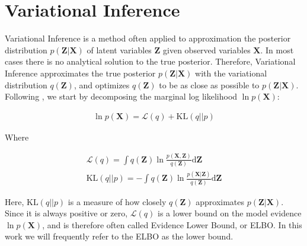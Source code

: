 \documentclass{report}
\begin{document}
\section{Variational Inference}\label{varinf}
Variational Inference is a method often applied to approximation the posterior distribution $p(\mathbf{Z}|\mathbf{X})$ of latent variables $\mathbf{Z}$ given observed variables $\mathbf{X}$. In most cases there is no analytical solution to the true posterior. Therefore, Variational Inference approximates the true posterior $p(\mathbf{Z}|\mathbf{X})$ with the variational distribution $q(\mathbf{Z})$, and optimizes $q(\mathbf{Z})$ to be as close as possible to $p(\mathbf{Z}|\mathbf{X})$. \\
Following \cite{bishop2006pattern}, we start by decomposing the marginal log likelihood $\ln p(\mathbf{X})$:

\begin{align}\label{lowKL}
\ln p(\mathbf{X}) = \mathcal{L}(q) + \text{KL}(q||p)
\end{align}

Where

\begin{align}
\mathcal{L}(q) = \int q(\mathbf{Z}) \ln \frac{p(\mathbf{X},\mathbf{{Z}})}{q(\mathbf{Z})}\text{d}\mathbf{Z} \label{elbodecom}\\
\text{KL}(q||p) = -\int q(\mathbf{Z}) \ln \frac{p(\mathbf{X}|\mathbf{{Z}})}{q(\mathbf{Z})}\text{d}\mathbf{Z}
\end{align}

Here, $\text{KL}(q||p)$ is a measure of how closely $q(\mathbf{Z})$ approximates $p(\mathbf{Z|X})$. Since it is always positive or zero, $\mathcal{L}(q)$ is a lower bound on the model evidence $\ln p(\mathbf{X})$, and is therefore often called Evidence Lower Bound, or ELBO. In this work we will frequently refer to the ELBO as the lower bound. \\
\end{document}

